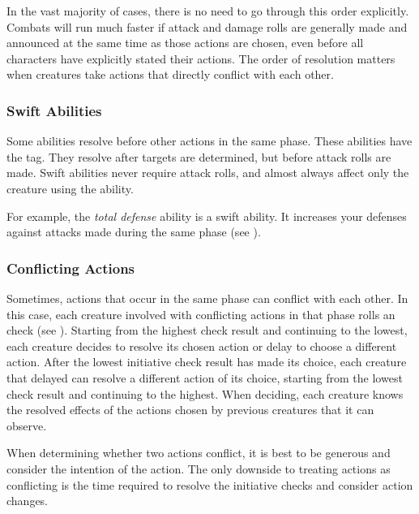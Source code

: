         In the vast majority of cases, there is no need to go through this order explicitly.
        Combats will run much faster if attack and damage rolls are generally made and announced at the same time as those actions are chosen, even before all characters have explicitly stated their actions.
        The order of resolution matters when creatures take actions that directly conflict with each other.

        \subsubsection{Swift Abilities}\label{Swift Abilities}
            Some abilities resolve before other actions in the same phase.
            These abilities have the  tag.
            They resolve after targets are determined, but before attack rolls are made.
            Swift abilities never require attack rolls, and almost always affect only the creature using the ability.

            For example, the \textit{total defense} ability is a swift ability.
            It increases your defenses against attacks made during the same phase (see ).

        \subsubsection{Conflicting Actions}\label{Conflicting Actions}

            Sometimes, actions that occur in the same phase can conflict with each other.
            In this case, each creature involved with conflicting actions in that phase rolls an  check (see ).
            Starting from the highest check result and continuing to the lowest, each creature decides to resolve its chosen action or delay to choose a different action.
            After the lowest initiative check result has made its choice, each creature that delayed can resolve a different action of its choice, starting from the lowest check result and continuing to the highest.
            When deciding, each creature knows the resolved effects of the actions chosen by previous creatures that it can observe.

            When determining whether two actions conflict, it is best to be generous and consider the intention of the action.
            The only downside to treating actions as conflicting is the time required to resolve the initiative checks and consider action changes.

